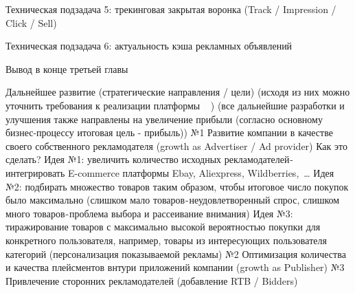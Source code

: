 \documentclass[specification,annotation,times]{itmo-student-thesis}
\begin{document}
Техническая подзадача 5: трекинговая закрытая воронка (Track / Impression / Click / Sell)

Техническая подзадача 6: актуальность кэша рекламных объявлений


\chapterconclusion

Вывод в конце третьей главы

\startconclusionpage

Дальнейшее развитие (стратегические направления / цели) (исходя из них можно уточнить требования к реализации платформы 🤔 )
(все дальнейшие разработки и улучшения также направлены на увеличение прибыли (согласно основному бизнес-процессу итоговая цель - прибыль))
№1 Развитие компании в качестве своего собственного рекламодателя (growth as Advertiser / Ad provider)
Как это сделать?
Идея №1: увеличить количество исходных рекламодателей - интегрировать E-commerce платформы Ebay, Aliexpress, Wildberries, …
Идея №2: подбирать множество товаров таким образом, чтобы итоговое число покупок было максимально (слишком мало товаров - неудовлетворенный спрос, слишком много товаров - проблема выбора и рассеивание внимания)
Идея №3: тиражирование товаров с максимально высокой вероятностью покупки для конкретного пользователя, например, товары из интересующих пользователя категорий (персонализация показываемой рекламы)
№2 Оптимизация количества и качества плейсментов внтури приложений компании (growth as Publisher)
№3 Привлечение сторонних рекламодателей (добавление RTB / Bidders)

\printmainbibliography


\appendix

                
\end{document}
